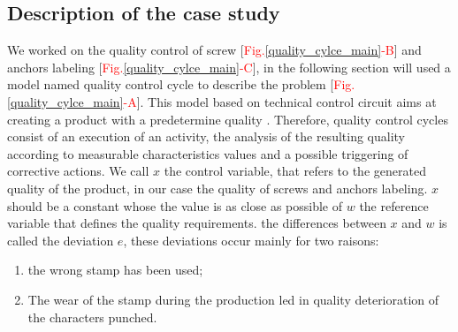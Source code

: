 \documentclass[12pt, french, a4paper]{article} %
\begin{document}
\subsection{Description of the case study}
We worked on the quality control of screw [\textcolor{red}{Fig.}\ref{quality_cylce_main}\textcolor{red}{-B}] and anchors labeling [\textcolor{red}{Fig.}\ref{quality_cylce_main}\textcolor{red}{-C}], in the following section will used a model named quality control cycle to describe the problem [\textcolor{red}{Fig.}\ref{quality_cylce_main}\textcolor{red}{-A}]. This model based on technical control circuit aims at creating a product with a predetermine quality \cite{linss2018qualitatsmanagement}. Therefore, quality control cycles consist of an execution of an activity, the analysis of the resulting quality according to measurable characteristics values and a possible triggering of corrective actions. We call $x$ the control variable, that refers to the generated quality of the product, in our case the quality of screws and anchors labeling. $x$ should be a constant whose the value is as close as possible of $w$ the reference variable that defines the quality requirements. the differences between $x$ and $w$ is called the deviation $e$, these deviations occur mainly for two raisons:
\begin{enumerate}
\itemsep0em 
 \item the wrong stamp has been used;
\item The wear of the stamp during the production led in quality deterioration of the characters punched.
\end{enumerate}
\end{document}
